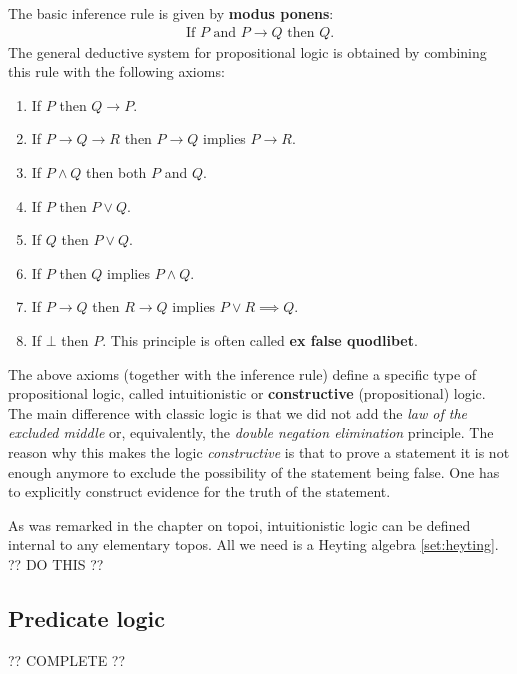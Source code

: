     The basic inference rule is given by \textbf{modus ponens}:
    \begin{gather}
        \text{If } P \text{ and } P\rightarrow Q \text{ then } Q.
    \end{gather}
    The general deductive system for propositional logic is obtained by combining this rule with the following axioms:
    \begin{enumerate}
        \item If $P$ then $Q\rightarrow P$.
        \item If $P\rightarrow Q \rightarrow R$ then $P\rightarrow Q$ implies $P\rightarrow R$.
        \item If $P\land Q$ then both $P$ and $Q$.
        \item If $P$ then $P\lor Q$.
        \item If $Q$ then $P\lor Q$.
        \item If $P$ then $Q$ implies $P\land Q$.
        \item If $P\rightarrow Q$ then $R\rightarrow Q$ implies $P\lor R\implies Q$.
        \item If $\bot$ then $P$. This principle is often called \textbf{ex false quodlibet}.
    \end{enumerate}

    \begin{remark}
        The above axioms (together with the inference rule) define a specific type of propositional logic, called intuitionistic or \textbf{constructive} (propositional) logic. The main difference with classic logic is that we did not add the \textit{law of the excluded middle} or, equivalently, the \textit{double negation elimination} principle. The reason why this makes the logic \textit{constructive} is that to prove a statement it is not enough anymore to exclude the possibility of the statement being false. One has to explicitly construct evidence for the truth of the statement.

        As was remarked in the chapter on topoi, intuitionistic logic can be defined internal to any elementary topos. All we need is a Heyting algebra \ref{set:heyting}. ?? DO THIS ??
    \end{remark}

\subsection{Predicate logic}

    ?? COMPLETE ??


